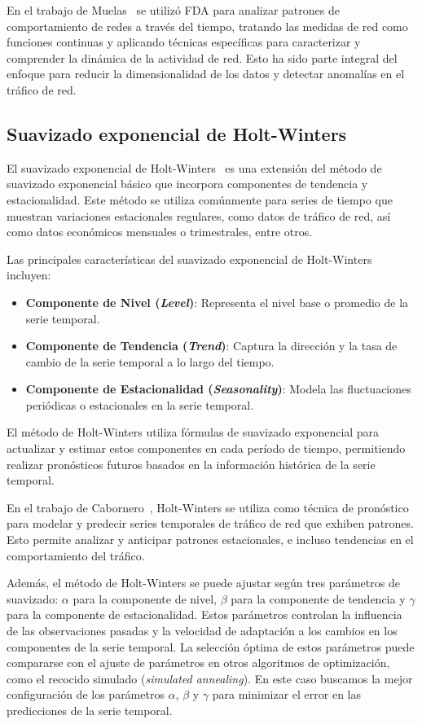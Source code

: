 En el trabajo de Muelas~\cite{muelas2015} se utilizó FDA para analizar patrones de comportamiento de redes a través del tiempo, tratando las medidas de red como funciones continuas y aplicando técnicas específicas para caracterizar y comprender la dinámica de la actividad de red. Esto ha sido parte integral del enfoque para reducir la dimensionalidad de los datos y detectar anomalías en el tráfico de red.

\subsection{Suavizado exponencial de Holt-Winters} %
El suavizado exponencial de Holt-Winters~\cite{chatfield1978holt} es una extensión del método de suavizado exponencial básico que incorpora componentes de tendencia y estacionalidad. Este método se utiliza comúnmente para series de tiempo que muestran variaciones estacionales regulares, como datos de tráfico de red, así como datos económicos mensuales o trimestrales, entre otros.

Las principales características del suavizado exponencial de Holt-Winters incluyen:
\begin{itemize}
    \item \textbf{Componente de Nivel (\textit{Level})}: Representa el nivel base o promedio de la serie temporal.
    \item \textbf{Componente de Tendencia (\textit{Trend})}: Captura la dirección y la tasa de cambio de la serie temporal a lo largo del tiempo.
    \item \textbf{Componente de Estacionalidad (\textit{Seasonality})}: Modela las fluctuaciones periódicas o estacionales en la serie temporal.
\end{itemize}
El método de Holt-Winters utiliza fórmulas de suavizado exponencial para actualizar y estimar estos componentes en cada período de tiempo, permitiendo realizar pronósticos futuros basados en la información histórica de la serie temporal. 

En el trabajo de Cabornero~\cite{cabornero2021}, Holt-Winters se utiliza como técnica de pronóstico para modelar y predecir series temporales de tráfico de red que exhiben patrones. Esto permite analizar y anticipar patrones estacionales, e incluso tendencias en el comportamiento del tráfico.

Además, el método de Holt-Winters se puede ajustar según tres parámetros de suavizado: $\alpha$ para la componente de nivel, $\beta$ para la componente de tendencia y $\gamma$ para la componente de estacionalidad. Estos parámetros controlan la influencia de las observaciones pasadas y la velocidad de adaptación a los cambios en los componentes de la serie temporal. La selección óptima de estos parámetros puede compararse con el ajuste de parámetros en otros algoritmos de optimización, como el recocido simulado (\textit{simulated annealing}). En este caso buscamos la mejor configuración de los parámetros $\alpha$, $\beta$ y $\gamma$ para minimizar el error en las predicciones de la serie temporal.

